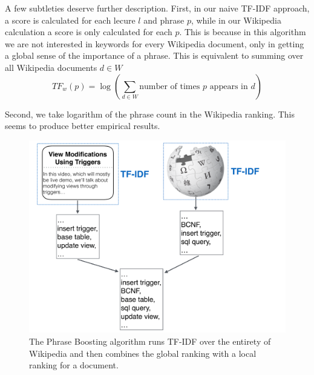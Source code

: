 A few subtleties deserve further description. First, in our naive TF-IDF approach, a score is calculated for each lecure $l$ and phrase $p$, while in our Wikipedia calculation a score is only calculated for each $p$. This is because in this algorithm we are not interested in keywords for every Wikipedia document, only in getting a global sense of the importance of a phrase. This is equivalent to summing over all Wikipedia documents $d \in W$
\begin{equation*}
TF_w(p) = \log \left(\sum_{d \in W} \text{number of times } p \text{ appears in } d\right)
\end{equation*}

Second, we take logarithm of the phrase count in the Wikipedia ranking. This seems to produce better empirical results.

\begin{figure}[!h]
\caption{The Phrase Boosting algorithm runs TF-IDF over the entirety of Wikipedia and then combines the global ranking with a local ranking for a document.}
\includegraphics[width=\textwidth]{phrase_boosting.pdf}
\end{figure}
